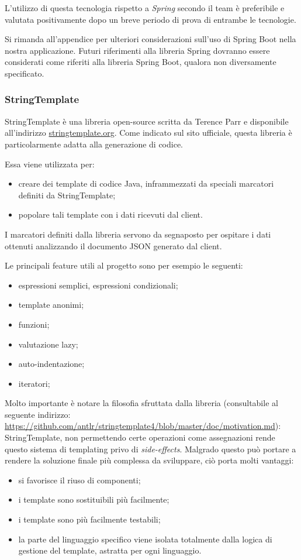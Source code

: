 L'utilizzo di questa tecnologia rispetto a \emph{Spring} secondo il team è preferibile e valutata positivamente dopo un breve periodo di prova di entrambe le tecnologie.

Si rimanda all'appendice %
per ulteriori considerazioni sull'uso di Spring Boot nella nostra applicazione. Futuri riferimenti alla libreria Spring dovranno essere considerati come riferiti alla libreria Spring Boot, qualora non diversamente specificato.

\subsubsection{StringTemplate}
StringTemplate è una libreria open-source scritta da Terence Parr e disponibile all'indirizzo \url{stringtemplate.org}. Come indicato sul sito ufficiale, questa libreria è particolarmente adatta alla generazione di codice. 

Essa viene utilizzata per:
\begin{itemize}
	\item creare dei template di codice Java, inframmezzati da speciali marcatori definiti da StringTemplate;
	\item popolare tali template con i dati ricevuti dal client.
\end{itemize}
I marcatori definiti dalla libreria servono da segnaposto per ospitare i dati ottenuti analizzando il documento JSON generato dal client.

Le principali feature utili al progetto sono per esempio le seguenti:

\begin{itemize}
\item espressioni semplici, espressioni condizionali;
\item template anonimi;
\item funzioni;
\item valutazione lazy;
\item auto-indentazione;
\item iteratori;
\end{itemize}

Molto importante è notare la filosofia sfruttata dalla libreria (consultabile al seguente indirizzo: \url{https://github.com/antlr/stringtemplate4/blob/master/doc/motivation.md}): StringTemplate, non permettendo certe operazioni come assegnazioni rende questo sistema di templating privo di \emph{side-effects}. Malgrado questo può portare a rendere la soluzione finale più complessa da sviluppare, ciò porta molti vantaggi:

\begin{itemize}
\item si favorisce il riuso di componenti;
\item i template sono sostituibili più facilmente;
\item i template sono più facilmente testabili;
\item la parte del linguaggio specifico viene isolata totalmente dalla logica di gestione del template, astratta per ogni linguaggio. 
\end{itemize}


